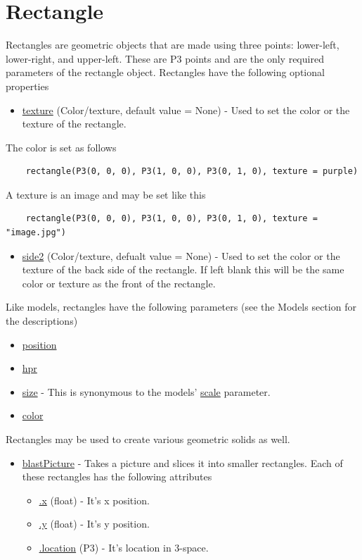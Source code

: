 \documentclass[10pt]{article}
\begin{document}
\section*{Rectangle}
Rectangles are geometric objects that are made using three points: lower-left, lower-right, and upper-left.
These are P3 points and are the only required parameters of the rectangle object.
Rectangles have the following optional properties
\begin{itemize}
    \item \underline{texture} (Color/texture, default value = None) - Used to set the color or the texture of the rectangle.
\end{itemize}
The color is set as follows
\begin{lstlisting}
    rectangle(P3(0, 0, 0), P3(1, 0, 0), P3(0, 1, 0), texture = purple)
\end{lstlisting}
A texture is an image and may be set like this
\begin{lstlisting}
    rectangle(P3(0, 0, 0), P3(1, 0, 0), P3(0, 1, 0), texture = "image.jpg")
\end{lstlisting}
\begin{itemize}
    \item \underline{side2} (Color/texture, defualt value = None) - Used to set the color or the texture of the back side of the rectangle.
    If left blank this will be the same color or texture as the front of the rectangle.
\end{itemize}
Like models, rectangles have the following parameters (see the Models section for the descriptions)
\begin{itemize}
    \item \underline{position}
    \item \underline{hpr}
    \item \underline{size} - This is synonymous to the models' \underline{scale} parameter.
    \item \underline{color}
\end{itemize}
Rectangles may be used to create various geometric solids as well.
\begin{itemize}
    \item \underline{blastPicture} - Takes a picture and slices it into smaller rectangles.
    Each of these rectangles has the following attributes
    \begin{itemize}
        \item \underline{.x} (float) - It's x position.
        \item \underline{.y} (float) - It's y position.
        \item \underline{.location} (P3) - It's location in 3-space.
    \end{itemize}
\end{itemize}
\end{document}
